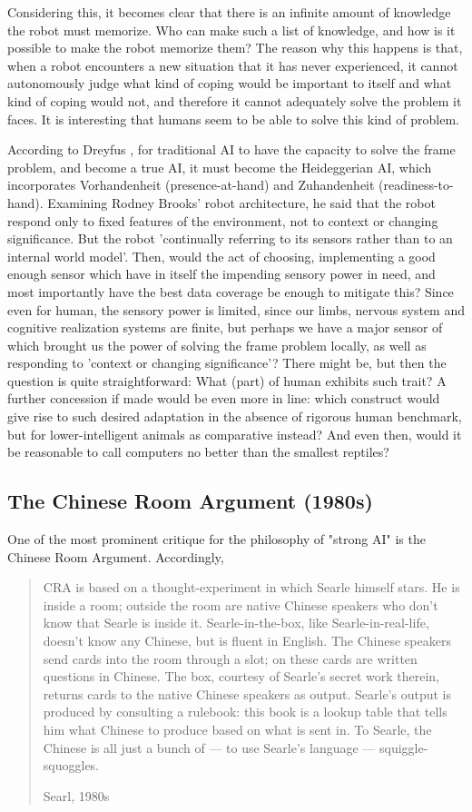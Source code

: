 Considering this, it becomes clear that there is an infinite amount of knowledge the robot must memorize. Who can make such a list of knowledge, and how is it possible to make the robot memorize them? The reason why this happens is that, when a robot encounters a new situation that it has never experienced, it cannot autonomously judge what kind of coping would be important to itself and what kind of coping would not, and therefore it cannot adequately solve the problem it faces. It is interesting that humans seem to be able to solve this kind of problem.

According to Dreyfus \cite{DreyfusImpasse1979}, for traditional AI to have the capacity to solve the frame problem, and become a true AI, it must become the Heideggerian AI, which incorporates Vorhandenheit (presence-at-hand) and Zuhandenheit (readiness-to-hand). Examining Rodney Brooks' robot architecture, he said that the robot respond only to fixed features of the environment, not to context or changing significance. But the robot 'continually referring to its sensors rather than to an internal world model'. Then, would the act of choosing, implementing a good enough sensor which have in itself the impending sensory power in need, and most importantly have the best data coverage be enough to mitigate this? Since even for human, the sensory power is limited, since our limbs, nervous system and cognitive realization systems are finite, but perhaps we have a major sensor of which brought us the power of solving the frame problem locally, as well as responding to 'context or changing significance'? There might be, but then the question is quite straightforward: What (part) of human exhibits such trait? A further concession if made would be even more in line: which construct would give rise to such desired adaptation in the absence of rigorous human benchmark, but for lower-intelligent animals as comparative instead? And even then, would it be reasonable to call computers no better than the smallest reptiles?
\subsection{The Chinese Room Argument (1980s)}
One of the most prominent critique for the philosophy of "strong AI" is the Chinese Room Argument. Accordingly,

\blockquote[Searl, 1980s]{CRA is based on a thought-experiment in which Searle himself stars. He is inside a room; outside the room are native Chinese speakers who don't know that Searle is inside it. Searle-in-the-box, like Searle-in-real-life, doesn't know any Chinese, but is fluent in English. The Chinese speakers send cards into the room through a slot; on these cards are written questions in Chinese. The box, courtesy of Searle's secret work therein, returns cards to the native Chinese speakers as output. Searle's output is produced by consulting a rulebook: this book is a lookup table that tells him what Chinese to produce based on what is sent in. To Searle, the Chinese is all just a bunch of --- to use Searle's language --- squiggle-squoggles.}

